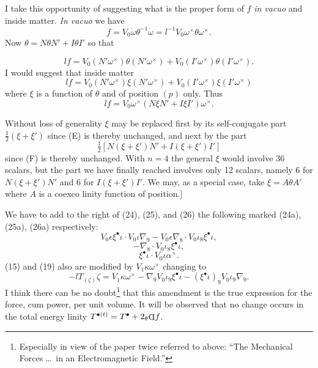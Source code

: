 \documentclass[11pt]{article}
\newcommand{\invd}{\mathord{\vcenter{\hbox{\rotatebox[origin=c]{180}{\(\mathrm{D}\)}}}}}
\newcommand{\thetaPi}{{}_\theta\invd}
\begin{document}
\indent I take this opportunity of suggesting what is the proper form of $f$ \emph{in vacuo} and inside matter. \emph{In vacuo} we have
\[
  f=V_0\dot\omega\theta^{-1}\dot\omega=l^{-1}V_0\omega^\times\theta\omega^\times.
\]
Now $\theta=N\theta N'+I\theta I'$ so that

\[
  lf=V_0(N'\omega^\times)\theta(N'\omega^\times)+V_0(I'\omega^\times)\theta(I'\omega^\times).
\]
I would suggest that inside matter
\begin{equation}
  lf=V_0(N'\omega^\times)\xi(N'\omega^\times)+V_0(I'\omega^\times)\xi(I'\omega^\times)
  \tag{E}
\end{equation}
where $\xi$ is a function of $\theta$ and of position $(p)$ only. Thus
\begin{equation}
  lf=V_0\omega^\times(N\xi N'+I\xi I')\omega^\times.
  \tag{F}
\end{equation}

Without loss of generality $\xi$ may be replaced first by its self-conjugate part $\tfrac12(\xi+\xi')$ since (E) is thereby unchanged, and next by the part
\[
  \tfrac12[N(\xi+\xi')N'+I(\xi+\xi')I']
\]
since (F) is thereby unchanged. With $n=4$ the general $\xi$ would involve 36 scalars, but the part we have finally reached involves only 12 scalars, namely 6 for $N(\xi+\xi')N'$ and 6 for $I(\xi+\xi')I'$. We may, as a special case, take $\xi=A\theta A'$ where $A$ is a coexco linity function of position.]

\indent We have to add to the right of (24), (25), and (26) the following marked (24a), (25a), (26a) respectively:
\[
  V_0\epsilon\xi^\bullet\iota\mathbin{\cdot}V_0\iota\nabla_9-V_0\epsilon\nabla_8\mathbin{\cdot}V_0\iota_8\xi^\bullet\iota,\tag{24a}
\]
\[
  -\nabla_8\mathbin{\cdot}V_0\iota_8\xi^\bullet\iota,\tag{25a}
\]
\[
  \xi^\bullet\iota\mathbin{\cdot}V_0\iota\alpha^\times.\tag{26a}
\]
(15) and (19) also are modified by $V_1\kappa\omega^\times$ changing to
\[
  -lT_{(\zeta)}\zeta=V_1\kappa\omega^\times-\nabla_9V_0\iota_9\xi^\bullet\iota-(\xi^\bullet\iota)_9V_0\iota_9\nabla_9.\tag{15a and 19a}
\]
I think there can be no doubt\footnote{Especially in view of the paper twice referred to above: ``The Mechanical Forces \ldots\ in an Electromagnetic Field.''} that this amendment is the true expression for the force, cum power, per unit volume. It will be observed that no change occurs in the total energy linity $T^{\bullet(t)}=T^\bullet+2\thetaPi f$.
\end{document}
